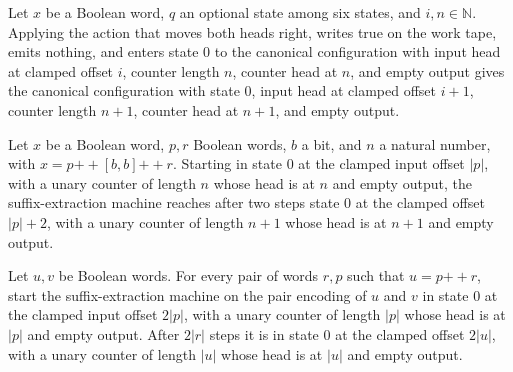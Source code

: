 \begin{lemma}
\label{Complexity.satDrop_write}
\leanok
{}
Let $x$ be a Boolean word, $q$ an optional state among six states, and
$i,n\in\mathbb{N}$. Applying the action that moves both heads right, writes true on the
work tape, emits nothing, and enters state $0$ to the canonical configuration with input
head at clamped offset $i$, counter length $n$, counter head at $n$, and empty output
gives the canonical configuration with state $0$, input head at clamped offset $i+1$,
counter length $n+1$, counter head at $n+1$, and empty output.
\end{lemma}

\begin{lemma}
\label{Complexity.satDrop_double}
\leanok
{}
Let $x$ be a Boolean word, $p,r$ Boolean words, $b$ a bit, and $n$ a natural number,
with $x=p\mathbin{++}[b,b]\mathbin{++}r$. Starting in state $0$ at the clamped input
offset $|p|$, with a unary counter of length $n$ whose head is at $n$ and empty output,
the suffix-extraction machine reaches after two steps state $0$ at the clamped offset
$|p|+2$, with a unary counter of length $n+1$ whose head is at $n+1$ and empty output.
\end{lemma}

\begin{lemma}
\label{Complexity.satDrop_parse}
\leanok
{}
Let $u,v$ be Boolean words. For every pair of words $r,p$ such that $u=p\mathbin{++}r$,
start the suffix-extraction machine on the pair encoding of $u$ and $v$ in state $0$ at
the clamped input offset $2|p|$, with a unary counter of length $|p|$ whose head is at
$|p|$ and empty output. After $2|r|$ steps it is in state $0$ at the clamped offset
$2|u|$, with a unary counter of length $|u|$ whose head is at $|u|$ and empty output.
\end{lemma}

